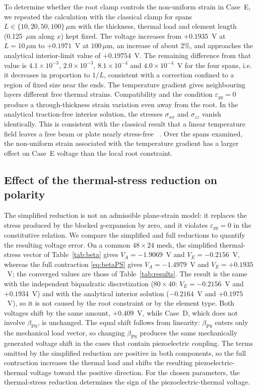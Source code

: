 \documentclass[a4paper,12pt]{elsarticle}
\begin{document}
To determine whether the root clamp controls the non-uniform strain
in Case~E, we repeated the calculation with the classical clamp for spans
$L\in\{10,20,50,100\}\,\mu\text{m}$ with the thickness, thermal load and element length
(0.125~$\mu$m along $x$) kept fixed. The voltage increases from $+0.1935$~V at
$L=10\,\mu\text{m}$ to $+0.1971$~V at $100\,\mu\text{m}$, an increase of about 2\%, and
approaches the analytical interior-limit value of $+0.19754$~V. The
remaining difference from that value is $4.1\times10^{-3}$, $2.0\times10^{-3}$,
$8.1\times10^{-4}$ and $4.0\times10^{-4}$~V for the four spans, i.e. it decreases in
proportion to $1/L$, consistent with a correction confined to a region of fixed size
near the ends. The temperature gradient gives neighbouring layers different free
thermal strains. Compatibility and the condition $\varepsilon_{yy}=0$
produce a through-thickness strain variation even away from the root. In the analytical traction-free interior solution, the stresses $\sigma_{xx}$ and
$\sigma_{zz}$ vanish identically. This is
consistent with the classical result that a linear temperature field leaves a free
beam or plate nearly stress-free ~\cite{BoleyWeiner1997}. Over the spans examined, the non-uniform strain associated with the
temperature gradient has a larger effect on Case~E voltage than the
local root constraint.

\subsection{Effect of the thermal-stress reduction on polarity}
\label{sec:polarity}

The simplified reduction is not an admissible plane-strain model: it replaces the stress produced by the blocked $y$-expansion by zero, and it violates $\varepsilon_{yy}=0$ in the constitutive relation. We compare the simplified and full reductions to quantify the resulting
voltage error. On a common $48\times24$ mesh, the simplified thermal-stress vector of
Table~\ref{tab:beta} gives $V_A=-1.9069$~V and $V_E=-0.2156$~V, whereas the full
contraction \eqref{eq:betaPS} gives $V_A=-1.4979$~V and $V_E=+0.1935$~V; the
converged values are those of Table~\ref{tab:results}. The result is the same with the
independent biquadratic discretization ($80\times40$: $V_E=-0.2156$~V and $+0.1934$~V) and with the analytical interior solution ($-0.2164$~V and $+0.1975$~V), so it is not caused by the root constraint or by the element type. Both voltages shift by the same
amount, $+0.409$~V, while Case~D, which does not involve $\beta_{\mathrm{PS}}$, is
unchanged. The equal shift follows from linearity: $\beta_{\mathrm{PS}}$ enters only
the mechanical load vector, so changing $\beta_{\mathrm{PS}}$ produces the same
mechanically generated voltage shift in the cases that contain piezoelectric coupling.
The terms omitted by the simplified reduction are positive in both components, so the
full contraction increases the thermal load and shifts the resulting
piezoelectric-thermal voltage toward the positive direction. For the chosen parameters, the thermal-stress reduction determines
the sign of the piezoelectric-thermal voltage.
\end{document}
